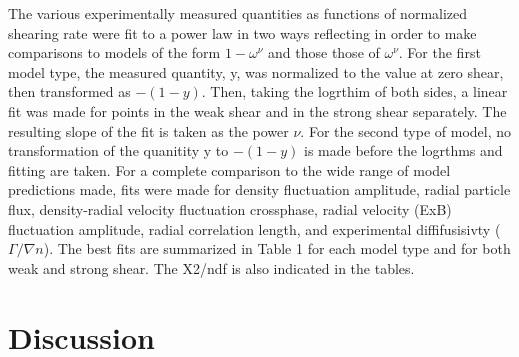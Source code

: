 \documentclass[aip,pop,amsmath,amssymb,reprint,superscriptaddress]{revtex4-1} %
\begin{document}
The various experimentally measured quantities as functions of normalized shearing rate were fit to a power law in two ways reflecting in order to make comparisons to models of the form $1-\omega^{\nu}$ and those those of $\omega^{\nu}$. For the first model type, the measured quantity, y, was normalized to the value at zero shear, then transformed as $-(1-y)$. Then, taking the logrthim of both sides, a linear fit was made for points in the weak shear and in the strong shear separately. The resulting slope of the fit is taken as the power $\nu$. For the second type of model, no transformation of the quanitity y to $-(1-y)$ is made before the logrthms and fitting are taken. For a complete comparison to the wide range of model predictions made, fits were made for density fluctuation amplitude, radial particle flux, density-radial velocity fluctuation crossphase, radial velocity (ExB) fluctuation amplitude, radial correlation length, and experimental diffifusisivty ($\Gamma/\nabla n$). The best fits are summarized in Table 1 for each model type and for both weak and strong shear. The X2/ndf is also indicated in the tables.

\section{Discussion}











\end{document}
